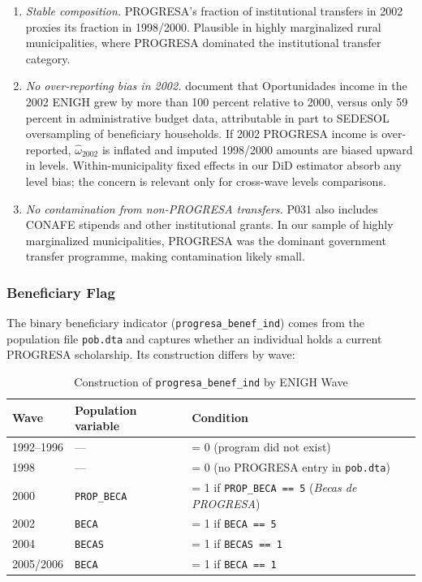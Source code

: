 \begin{enumerate}
  \item \textit{Stable composition.} PROGRESA's fraction of institutional
    transfers in 2002 proxies its fraction in 1998/2000. Plausible in highly
    marginalized rural municipalities, where PROGRESA dominated the
    institutional transfer category.
  \item \textit{No over-reporting bias in 2002.} \citet{hernandez2007}
    document that Oportunidades income in the 2002 ENIGH grew by more than 100
    percent relative to 2000, versus only 59 percent in administrative budget
    data, attributable in part to SEDESOL oversampling of beneficiary
    households. If 2002 PROGRESA income is over-reported, $\hat\omega_{2002}$
    is inflated and imputed 1998/2000 amounts are biased upward in levels.
    Within-municipality fixed effects in our DiD estimator absorb any
    level bias; the concern is relevant only for cross-wave levels comparisons.
  \item \textit{No contamination from non-PROGRESA transfers.} P031 also
    includes CONAFE stipends and other institutional grants. In our sample of
    highly marginalized municipalities, PROGRESA was the dominant government
    transfer programme, making contamination likely small.
\end{enumerate}

\subsubsection{Beneficiary Flag}
\label{app:enigh_benef_flag}

The binary beneficiary indicator (\texttt{progresa\_benef\_ind}) comes from
the population file \texttt{pob.dta} and captures whether an individual holds a
current PROGRESA scholarship. Its construction differs by wave:

\begin{table}[h!]
\centering
\caption{Construction of \texttt{progresa\_benef\_ind} by ENIGH Wave}
\label{tab:benef_flag}
\small
\begin{tabular}{lll}
\hline\hline
Wave & Population variable & Condition \\
\hline
1992--1996 & --- & = 0 (program did not exist) \\
1998       & --- & = 0 (no PROGRESA entry in \texttt{pob.dta}) \\
2000       & \texttt{PROP\_BECA} & = 1 if \texttt{PROP\_BECA == 5}
             (\textit{Becas de PROGRESA}) \\
2002       & \texttt{BECA}       & = 1 if \texttt{BECA == 5} \\
2004       & \texttt{BECAS}      & = 1 if \texttt{BECAS == 1} \\
2005/2006  & \texttt{BECA}       & = 1 if \texttt{BECA == 1} \\
\hline\hline
\end{tabular}
\end{table}

